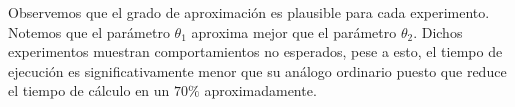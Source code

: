 Observemos que el grado de aproximación es plausible para cada experimento. Notemos que el parámetro $\theta_1$ aproxima mejor que el parámetro $\theta_2$. Dichos experimentos muestran comportamientos no esperados, pese a esto, el tiempo de ejecución es significativamente menor que su análogo ordinario puesto que reduce el tiempo de cálculo en un $70\%$ aproximadamente.





